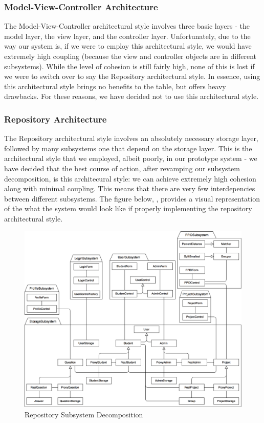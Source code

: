 \documentclass[12pt,letterpaper]{article}
\begin{document}
\subsubsection*{Model-View-Controller Architecture}

The Model-View-Controller architectural style involves three basic layers - the model layer, the view layer, and the controller layer. Unfortunately, due to the way our system is, if we were to employ this architectural style, we would have extremely high coupling (because the view and controller objects are in different subsystems). While the level of cohesion is still fairly high, none of this is lost if we were to switch over to say the Repository architectural style. In essence, using this architectural style brings no benefits to the table, but offers heavy drawbacks. For these reasons, we have decided not to use this architectural style.

\subsubsection*{Repository Architecture}

The Repository architectural style involves an absolutely necessary storage layer, followed by many subsystems one that depend on the storage layer. This is the architectural style that we employed, albeit poorly, in our prototype system - we have decided that the best course of action, after revamping our subsystem decomposition, is this architecural style: we can achieve extremely high cohesion along with minimal coupling. This means that there are very few interdepencies between different subsystems. The figure below, , provides a visual representation of the what the system would look like if properly implementing the repository architectural style.

\begin{figure}[H]
	\centering{}
	\includegraphics[scale=0.25]{imgs/d3/decomp/repository.png}
	\caption{Repository Subsystem Decomposition}
\end{figure}
\end{document}
